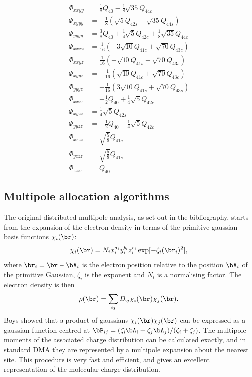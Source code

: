 \documentclass[12pt,txfonts]{paper}
\let\cite=\citep
\begin{document}
\begin{table}
\begin{center}
{\begin{align*}
\Phi_{xxyy} &= {\tfrac{1}{8}} Q_{40} - {\tfrac{1}{8}}\sqrt{35}Q_{44c}\\
\Phi_{xyyy} &= -{\tfrac{1}{8}}(\sqrt{5}Q_{42s}+\sqrt{35}Q_{44s})\\
\Phi_{yyyy} &= {\tfrac{3}{8}} Q_{40} + {\tfrac{1}{4}}\sqrt5 Q_{42c}
          + {\tfrac{1}{8}}\sqrt{35}Q_{44c}\\
\Phi_{xxxz} &= {\tfrac{1}{16}}(-3\sqrt{10}Q_{41c}+\sqrt{70}Q_{43c})\\
\Phi_{xxyz} &= {\tfrac{1}{16}}(-\sqrt{10}Q_{41s}+\sqrt{70}Q_{43s})\\
\Phi_{xyyz} &= -{\tfrac{1}{16}}(\sqrt{10}Q_{41c}+\sqrt{70}Q_{43c})\\
\Phi_{yyyz} &= -{\tfrac{1}{16}}(3\sqrt{10}Q_{41s}+\sqrt{70}Q_{43s})\\
\Phi_{xxzz} &= -{\tfrac{1}{2}} Q_{40} + {\tfrac{1}{4}}\sqrt5 Q_{42c}\\
\Phi_{xyzz} &= {\tfrac{1}{4}}\sqrt5 Q_{42s}\\
\Phi_{yyzz} &= -{\tfrac{1}{2}} Q_{40} - {\tfrac{1}{4}}\sqrt5 Q_{42c}\\
\Phi_{xzzz} &= \sqrt{{\tfrac{5}{8}}}Q_{41c}\\
\Phi_{yzzz} &= \sqrt{{\tfrac{5}{8}}}Q_{41s}\\
\Phi_{zzzz} &= Q_{40}
\end{align*}}
\end{center}
\end{table}

\subsection {Multipole allocation algorithms}

The original distributed multipole analysis, as set out in the
bibliography\cite{Stone81a,StoneA85,timf}, starts from the expansion
of the electron density in terms of the primitive gaussian basis
functions $\chi_i(\br)$:
\begin{equation}
\chi_i(\br) = N_i x_i^{a_i}y_i^{b_i}z_i^{c_i}\exp[-\zeta_i(\br_i)^2],
\end{equation}
where $\br_i=\br-\bA_i$ is the electron position relative to the
position $\bA_i$ of the primitive Gaussian, $\zeta_i$ is the exponent
and $N_i$ is a normalising factor.
The electron density is then
\begin{equation}
\rho(\br) = \sum_{ij} D_{ij} \chi_i(\br)\chi_j(\br).
\end{equation}
Boys\cite{Boys50} showed that a product of gaussians
$\chi_i(\br)\chi_j(\br)$ can be expressed as a gaussian function
centred at $\bP_{ij}=(\zeta_i\bA_i+\zeta_j\bA_j)/(\zeta_i+\zeta_j)$. The
multipole moments of the associated charge distribution can be
calculated exactly, and in standard DMA they are represented by a
multipole expansion about the nearest site. This procedure is very
fast and efficient, and gives an excellent representation of the
molecular charge distribution.
\end{document}
